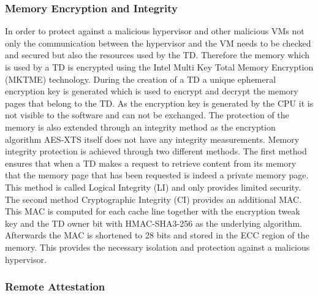 \documentclass[sigplan,screen,nonacm]{acmart}
\begin{document}
\subsubsection{Memory Encryption and Integrity}

In order to protect against a malicious hypervisor and other malicious VMs not only the communication between the hypervisor and the VM needs to be checked and secured but also the resources used by the TD.
Therefore the memory which is used by a TD is encrypted using the Intel Multi Key Total Memory Encryption (MKTME) technology.
During the creation of a TD a unique ephemeral encryption key is generated which is used to encrypt and decrypt the memory pages that belong to the TD.
As the encryption key is generated by the CPU it is not visible to the software and can not be exchanged\cite{Intel-MKTME}.
The protection of the memory is also extended through an integrity method as the encryption algorithm AES-XTS itself does not have any integrity measurements.
Memory integrity protection is achieved through two different methods.
The first method ensures that when a TD makes a request to retrieve content from its memory that the memory page that has been requested is indeed a private memory page.
This method is called Logical Integrity (LI) and only provides limited security\cite[p. 120]{Intel-TDX-Module-Specs}.
The second method Cryptographic Integrity (CI) provides an additional MAC.
This MAC is computed for each cache line together with the encryption tweak key and the TD owner bit with HMAC-SHA3-256 as the underlying algorithm\cite[p. 3]{Intel-TDX-Whitepaper}.
Afterwards the MAC is shortened to 28 bits and stored in the ECC region of the memory.
This provides the necessary isolation and protection against a malicious hypervisor.

\subsubsection{Remote Attestation}
\end{document}
